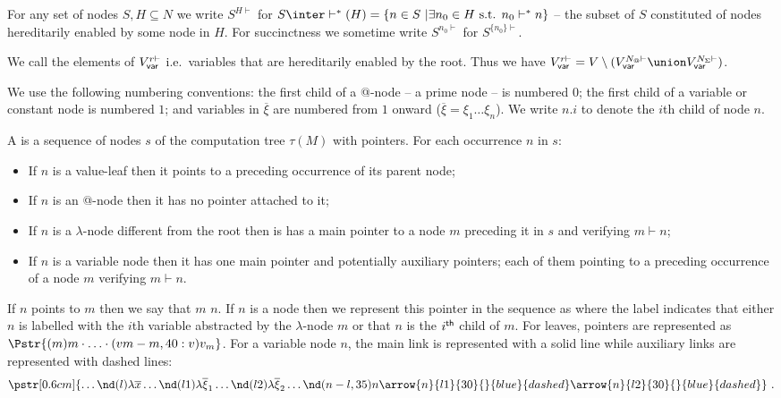For any set of nodes $S, H \subseteq N$ we write $S^{H\vdash}$ for $S \inter \vdash^*(H) = \{ n \in S \ | \exists n_0 \in H \mbox{ s.t. }n_0  \vdash^* n \}$ -- the subset of $S$ constituted of nodes hereditarily enabled by some node in $H$. For succinctness we sometime write $S^{n_0\vdash}$ for
$S^{\{n_0\}\vdash}$.

We call  the elements of $V_{\sf var}^{r\vdash}$ i.e.\
variables that are hereditarily enabled by the root. Thus we have
$V_{\sf var}^{r\vdash} = V \setminus ( V_{\sf var}^{N_@\vdash}
\union V_{\sf var}^{N_\Sigma\vdash})$.
\smallskip

We use the following numbering conventions:
the first child of a @-node -- a prime node -- is numbered $0$;
the first child of a variable or constant node is numbered $1$;
and variables in $\overline{\xi}$ are numbered from $1$ onward ($\overline{\xi} = \xi_1 \ldots \xi_n$).
We write $n.i$ to denote the $i$th child of node $n$.

\begin{definition}
A  is a sequence of nodes $s$
of the computation tree $\tau(M)$ with pointers. For each occurrence
$n$ in $s$:
\begin{itemize}
  \item If $n$ is a value-leaf then it points to a preceding occurrence of its parent node;
  \item If $n$ is an @-node then it has no pointer attached to it;
  \item If $n$ is a $\lambda$-node different from the root
  then is has a main pointer to a node $m$ preceding it in $s$ and verifying $m \vdash n$;
  \item If $n$ is a variable node then it has one main pointer and
  potentially auxiliary pointers; each of them pointing to a
  preceding occurrence of a node $m$ verifying $m \vdash n$.
\end{itemize}

If $n$ points to $m$ then we say that $m$  $n$.
If $n$ is a node then we represent this pointer in the sequence as \Pstr[0.4cm]{
(m){m} \ldots (n-m,45:i) n } where the label indicates that either
$n$ is labelled with the $i$th variable abstracted by the
$\lambda$-node $m$ or that $n$ is the $i^{\sf th}$ child of $m$.
For leaves, pointers are represented as
$\Pstr{ (m){m} \cdot \ldots \cdot (vm-m,40:v){v_m} }$.
For a variable node $n$, the main link is represented with a solid
line while auxiliary links are represented with dashed lines:
$$\pstr[0.6cm]{ \ldots
    \nd(l){\lambda \overline{x}}  \ldots
    \nd(l1){\lambda \overline{\xi}_1} \ldots
    \nd(l2){\lambda \overline{\xi}_2 } \ldots
    \nd(n-l,35){n}
    \arrow{n}{l1}{30}{}{blue}{dashed}
    \arrow{n}{l2}{30}{}{blue}{dashed}
} \ .$$
\end{definition}


